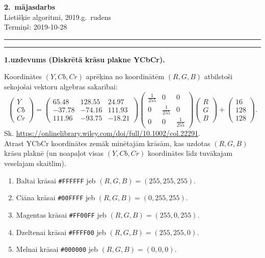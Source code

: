 \documentclass[a4paper,12pt]{article}
\begin{document}
\thispagestyle{empty}

\begin{center}
{\bf\Huge 2.\ mājasdarbs} \\[5pt]
Lietišķie algoritmi, 2019.g.\ rudens\\
Termiņš: 2019-10-28
\end{center}

\hrule
\vspace{2pt}
\hrule
\vspace{12pt}




\vspace{10pt}
{\bf 1.uzdevums (Diskrētā krāsu plakne YCbCr).}

Koordinātes $(Y,Cb,Cr)$ aprēķina no koordinātēm $(R,G,B)$ atbilstoši 
sekojošai vektoru algebras sakarībai:
$$\left( \begin{array}{c}
Y\\
Cb\\
Cr
\end{array} \right) = \left( \begin{array}{ccc}
65.48 & 128.55 & 24.97\\
-37.78 & -74.16 & 111.93\\
111.96 & -93.75 & -18.21
\end{array} \right) \left( \begin{array}{ccc}
\frac{1}{255} & 0 & 0\\
0 & \frac{1}{255} & 0\\
0 & 0 & \frac{1}{255}
\end{array} \right) 
\left( \begin{array}{c}
R\\
G\\
B
\end{array} \right) + \left( \begin{array}{c}
16\\
128\\
128
\end{array} \right).$$
Sk. \url{https://onlinelibrary.wiley.com/doi/full/10.1002/col.22291}.\\
Atrast YCbCr koordinātes zemāk minētajām krāsām, kas uzdotas $(R,G,B)$ krāsu plaknē
(un noapaļot visas $(Y,Cb,Cr)$ koordinātes līdz tuvākajam veselajam skaitlim). 
\begin{enumerate}
\item Baltai krāsai {\tt \#FFFFFF} jeb $(R,G,B) = (255,255,255)$. 
\item Ciāna krāsai  {\tt \#00FFFF} jeb $(R,G,B) = (0,255,255)$.
\item Magentas krāsai {\tt \#FF00FF} jeb $(R,G,B) = (255,0,255)$. 
\item Dzeltenai krāsai {\tt \#FFFF00} jeb $(R,G,B) = (255,255,0)$. 
\item Melnai krāsai  {\tt \#000000} jeb $(R,G,B) = (0,0,0)$.
\end{enumerate}
\end{document}
